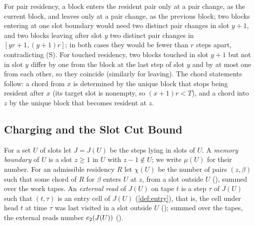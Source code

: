 \begin{outline}
For pair residency, a block enters the resident pair only at a pair change, as the current block, and
leaves only at a pair change, as the previous block; two blocks entering at one slot boundary would need two distinct pair changes in slot $y+1$, and two blocks leaving after slot $y$ two distinct pair changes in $[yr+1,(y+1)r]$; in both cases they would be fewer than $r$ steps apart, contradicting (S). For touched residency, two blocks touched
in slot $y+1$ but not in slot $y$ differ by one from the block at the last step of slot $y$ and by at most
one from each other, so they coincide (similarly for leaving). The chord statements follow: a chord from
$x$ is determined by the unique block that stops being resident after $x$ (its target slot is nonempty, so
$(x+1)r<T$), and a chord into $z$ by the unique block that becomes resident at $z$.
\end{outline}

\subsection{Charging and the Slot Cut Bound}

For a set $U$ of slots let $J=J(U)$ be the steps lying in slots of $U$. A \emph{memory boundary}
of $U$ is a slot $z\ge1$ in $U$ with $z-1\notin U$; we write $\mu(U)$ for their number. For an
admissible residency $R$ let $\chi(U)$ be the number of pairs $(z,\beta)$ such that some chord of
$R$ for $\beta$ enters $U$ at $z$, from a slot outside $U$ (), summed over the
work tapes. An \emph{external read} of $J(U)$ on tape $t$ is a step $\tau$ of $J(U)$ such that $(t,\tau)$ is
an entry cell of $J(U)$ (\cref{def:entry}), that is, the cell under head $t$ at time $\tau$ was last visited
in a slot outside $U$ (); summed over the tapes, the external reads number $e_2(J(U))$
().

